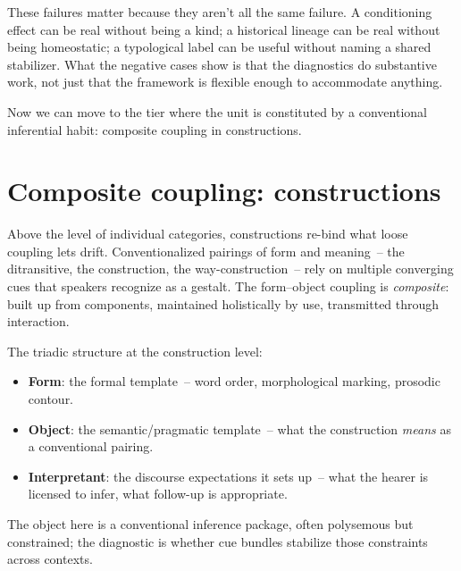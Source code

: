 These failures matter because they aren't all the same failure. A conditioning effect can be real without being a kind; a historical lineage can be real without being homeostatic; a typological label can be useful without naming a shared stabilizer. What the negative cases show is that the diagnostics do substantive work, not just that the framework is flexible enough to accommodate anything.

Now we can move to the tier where the unit is constituted by a conventional inferential habit: composite coupling in constructions.

\section{Composite coupling: constructions}
\label{sec:14:constructions}

Above the level of individual categories, constructions re-bind what loose coupling lets drift. Conventionalized pairings of form and meaning~-- the ditransitive, the  construction, the way-construction~-- rely on multiple converging cues that speakers recognize as a gestalt. The form--object coupling is \emph{composite}: built up from components, maintained holistically by use, transmitted through interaction.

The triadic structure at the construction level:

\begin{itemize}
    \item \textbf{Form}: the formal template~-- word order, morphological marking, prosodic contour.
    \item \textbf{Object}: the semantic/pragmatic template~-- what the construction \emph{means} as a conventional pairing.
    \item \textbf{Interpretant}: the discourse expectations it sets up~-- what the hearer is licensed to infer, what follow-up is appropriate.
\end{itemize}

The object here is a conventional inference package, often polysemous but constrained; the diagnostic is whether cue bundles stabilize those constraints across contexts.

